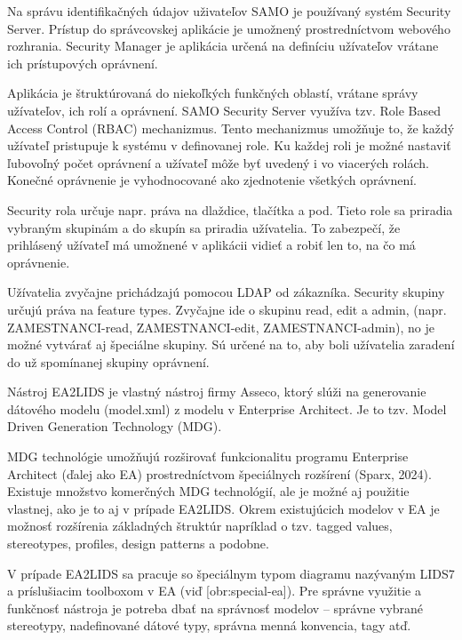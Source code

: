 
Na správu identifikačných údajov uživateľov SAMO je používaný systém Security Server. Prístup do správcovskej aplikácie je umožnený prostredníctvom webového rozhrania. Security Manager je aplikácia určená na definíciu užívateľov vrátane ich prístupových oprávnení. 

Aplikácia je štruktúrovaná do niekoľkých funkčných oblastí, vrátane správy užívateľov, ich rolí a oprávnení. SAMO Security Server využíva tzv. Role Based Access Control (RBAC) mechanizmus. Tento mechanizmus umožňuje to, že každý užívateľ pristupuje k systému v definovanej role. Ku každej roli je možné nastaviť ľubovoľný počet oprávnení a užívateľ môže byť uvedený i vo viacerých rolách. Konečné oprávnenie je vyhodnocované ako zjednotenie všetkých oprávnení.

Security rola určuje napr. práva na dlaždice, tlačítka a pod. Tieto role sa priradia vybraným skupinám a do skupín sa priradia užívatelia. To zabezpečí, že prihlásený užívateľ má umožnené v aplikácii vidieť a robiť len to, na čo má oprávnenie.

Užívatelia zvyčajne prichádzajú pomocou LDAP od zákazníka. Security skupiny určujú práva na feature types. Zvyčajne ide o skupinu read, edit a admin, (napr. ZAMESTNANCI-read, ZAMESTNANCI-edit, ZAMESTNANCI-admin), no je možné vytvárať aj špeciálne skupiny. Sú určené na to, aby boli užívatelia zaradení do už spomínanej skupiny oprávnení.

Nástroj EA2LIDS je vlastný nástroj firmy Asseco, ktorý slúži na generovanie dátového modelu (model.xml) z modelu v Enterprise Architect. Je to tzv. Model Driven Generation Technology (MDG). 

MDG technológie umožňujú rozširovať funkcionalitu programu Enterprise Architect (ďalej ako EA) prostredníctvom špeciálnych rozšírení \scr(Sparx, 2024). Existuje množstvo komerčných MDG technológií, ale je možné aj použitie vlastnej, ako je to aj v prípade EA2LIDS. Okrem existujúcich modelov v EA je možnosť rozšírenia základných štruktúr napríklad o tzv. tagged values, stereotypes, profiles, design patterns a podobne. 

V prípade EA2LIDS sa pracuje so špeciálnym typom diagramu nazývaným LIDS7 a príslušiacim toolboxom v EA (viď [obr:special-ea]). Pre správne využitie a funkčnosť nástroja je potreba dbať na správnosť modelov -- správne vybrané stereotypy, nadefinované dátové typy, správna menná konvencia, tagy atď. 

